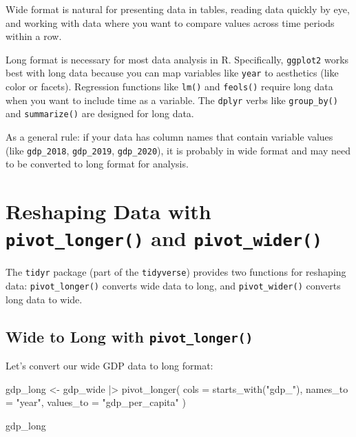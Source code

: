 \documentclass[
  letterpaper,
  DIV=11,
  numbers=noendperiod]{scrreprt}
\newenvironment{Shaded}{\begin{snugshade}}{\end{snugshade}}
\newcommand{\AttributeTok}[1]{\textcolor[rgb]{0.40,0.45,0.13}{#1}}
\newcommand{\FunctionTok}[1]{\textcolor[rgb]{0.28,0.35,0.67}{#1}}
\newcommand{\NormalTok}[1]{\textcolor[rgb]{0.00,0.23,0.31}{#1}}
\newcommand{\OtherTok}[1]{\textcolor[rgb]{0.00,0.23,0.31}{#1}}
\newcommand{\SpecialCharTok}[1]{\textcolor[rgb]{0.37,0.37,0.37}{#1}}
\newcommand{\StringTok}[1]{\textcolor[rgb]{0.13,0.47,0.30}{#1}}
\begin{document}
Wide format is natural for presenting data in tables, reading data
quickly by eye, and working with data where you want to compare values
across time periods within a row.

Long format is necessary for most data analysis in R. Specifically,
\texttt{ggplot2} works best with long data because you can map variables
like \texttt{year} to aesthetics (like color or facets). Regression
functions like \texttt{lm()} and \texttt{feols()} require long data when
you want to include time as a variable. The \texttt{dplyr} verbs like
\texttt{group\_by()} and \texttt{summarize()} are designed for long
data.

As a general rule: if your data has column names that contain variable
values (like \texttt{gdp\_2018}, \texttt{gdp\_2019},
\texttt{gdp\_2020}), it is probably in wide format and may need to be
converted to long format for analysis.

\section{\texorpdfstring{Reshaping Data with \texttt{pivot\_longer()}
and
\texttt{pivot\_wider()}}{Reshaping Data with pivot\_longer() and pivot\_wider()}}\label{reshaping-data-with-pivot_longer-and-pivot_wider}

The \texttt{tidyr} package (part of the \texttt{tidyverse}) provides two
functions for reshaping data: \texttt{pivot\_longer()} converts wide
data to long, and \texttt{pivot\_wider()} converts long data to wide.

\subsection{\texorpdfstring{Wide to Long with
\texttt{pivot\_longer()}}{Wide to Long with pivot\_longer()}}\label{wide-to-long-with-pivot_longer}

Let's convert our wide GDP data to long format:

\begin{Shaded}
\begin{Highlighting}[]
\NormalTok{gdp\_long }\OtherTok{\textless{}{-}}\NormalTok{ gdp\_wide }\SpecialCharTok{|\textgreater{}}
  \FunctionTok{pivot\_longer}\NormalTok{(}
    \AttributeTok{cols =} \FunctionTok{starts\_with}\NormalTok{(}\StringTok{"gdp\_"}\NormalTok{),}
    \AttributeTok{names\_to =} \StringTok{"year"}\NormalTok{,}
    \AttributeTok{values\_to =} \StringTok{"gdp\_per\_capita"}
\NormalTok{  )}

\NormalTok{gdp\_long}
\end{Highlighting}
\end{Shaded}
\end{document}
